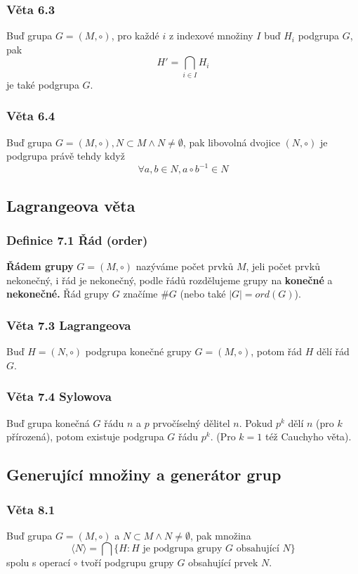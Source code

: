 \documentclass[12pt, letterpaper]{article}
\begin{document}
\subsubsection*{Věta 6.3}
Buď grupa $G = (M, \circ)$, pro každé $i$ z indexové množiny $I$ buď $H_{i}$ podgrupa $G$, pak 
\[H' = \bigcap_{i \in I} H_i\] je také podgrupa $G$.

\subsubsection*{Věta 6.4}
Buď grupa $G = (M, \circ), N \subset M \wedge N \neq \emptyset$,
pak libovolná dvojice $(N, \circ)$ je podgrupa právě tehdy když
\[ \forall a,b \in N, a \circ b^{-1} \in N \]

\subsection{Lagrangeova věta}

\subsubsection*{Definice 7.1 Řád (order)}
\textbf{Řádem grupy} $G = (M, \circ)$ nazýváme počet prvků $M$,
jeli počet prvků nekonečný, i řád je nekonečný, podle řádů rozdělujeme grupy na \textbf{konečné} a \textbf{nekonečné.}
Řád grupy $G$ značíme $\#G$ (nebo také $|G| = ord(G)$).

\subsubsection*{Věta 7.3 Lagrangeova}
Buď $H = (N, \circ)$ podgrupa konečné grupy $G = (M, \circ)$, potom řád $H$ dělí řád $G$.

\subsubsection*{Věta 7.4 Sylowova}
Buď grupa konečná $G$ řádu $n$ a $p$ prvočíselný dělitel $n$. Pokud $p^k$ dělí $n$ (pro $k$ přírozená),
potom existuje podgrupa $G$ řádu $p^k$. (Pro $k = 1$ též Cauchyho věta).

\subsection{Generující množiny a generátor grup}

\subsubsection*{Věta 8.1}
Buď grupa $G = (M, \circ)$ a $N \subset M \wedge N \neq \emptyset$, pak množina
\[ \langle N \rangle = \bigcap\{H: \textrm{$H$ je podgrupa grupy $G$ obsahující $N$}\} \]
spolu s operací $\circ$ tvoří podgrupu grupy $G$ obsahující prvek $N$.
\end{document}
